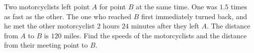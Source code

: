 Two motorcyclists left point $A$ for point $B$ at the same time. One was $1.5$ times as fast as the other. The one who reached $B$ first immediately turned back, and he met the other motorcyclist $2$ hours $24$ minutes after they left $A$. The distance from $A$ to $B$ is $120$ miles. Find the speeds of the motorcyclists and the distance from their meeting point to $B$.

